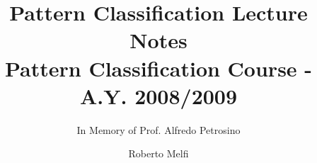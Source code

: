 \documentclass[envcountsame,envcountchap]{svmono}
\begin{document}
\author{Roberto Melfi}
\title{Pattern Classification Lecture Notes\\
{\small Pattern Classification Course - A.Y. 2008/2009}}
\subtitle{In Memory of Prof. Alfredo Petrosino}
\maketitle

\frontmatter%




\tableofcontents


\mainmatter%







%





\backmatter%
%

\printindex

\end{document}
